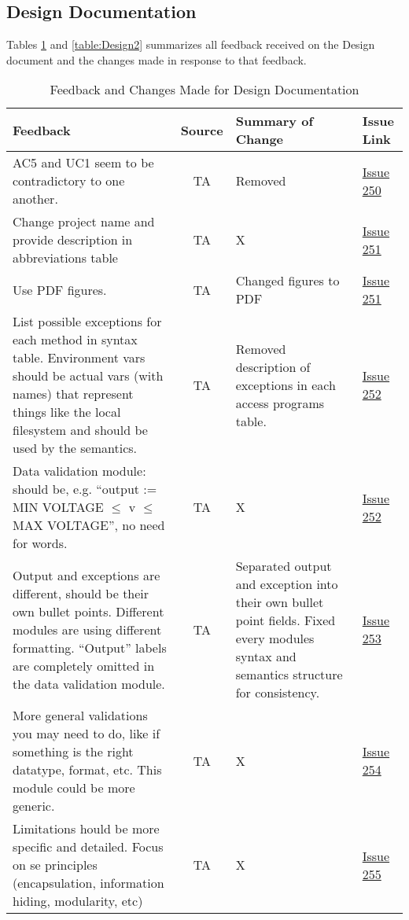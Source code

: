 \documentclass{article}
\begin{document}
\subsection{Design Documentation}
Tables \ref{table:Design1} and \ref{table:Design2} summarizes all feedback received on the Design document
and the changes made in response to that feedback.
\begin{table}[H]
\centering
\begin{tabularx}{\textwidth}{|X|c|X|p{1.5cm}|}
    \hline
    \textbf{Feedback} & \textbf{Source} & \textbf{Summary of Change}
    & \textbf{Issue Link} \\
    \hline
    AC5 and UC1 seem to be contradictory to one another. & TA & Removed &
    \href{https://github.com/SumanyaG/Alkalytics/issues/250}{Issue 250} \\
    \hline
    Change project name and provide description in abbreviations table & TA & X
    & \href{https://github.com/SumanyaG/Alkalytics/issues/251}{Issue 251} \\
    \hline
    Use PDF figures. & TA & Changed figures to PDF &
    \href{https://github.com/SumanyaG/Alkalytics/issues/251}{Issue 251} \\
    \hline
    List possible exceptions for each method in syntax table. Environment vars
    should be actual vars (with names) that represent things like the local
    filesystem and should be used by the semantics. & TA & Removed description
    of exceptions in each access programs table. &
    \href{https://github.com/SumanyaG/Alkalytics/issues/252}{Issue 252} \\
    \hline
    Data validation module: should be, e.g. ``output := MIN VOLTAGE $\le$ v
    $\le$ MAX VOLTAGE'', no need for words. & TA & X &
    \href{https://github.com/SumanyaG/Alkalytics/issues/252}{Issue 252} \\
    \hline
    Output and exceptions are different, should be their own bullet points.
    Different modules are using different formatting. ``Output'' labels are
    completely omitted in the data validation module. & TA & Separated output
    and exception into their own bullet point fields. Fixed every modules syntax
    and semantics structure for consistency. &
    \href{https://github.com/SumanyaG/Alkalytics/issues/253}{Issue 253} \\
    \hline
    More general validations you may need to do, like if something is the
    right datatype, format, etc. This module could be more generic. & TA & X &
    \href{https://github.com/SumanyaG/Alkalytics/issues/254}{Issue 254} \\
    \hline
    Limitations hould be more specific and detailed. Focus on se principles
    (encapsulation, information hiding, modularity, etc) & TA & X &
    \href{https://github.com/SumanyaG/Alkalytics/issues/255}{Issue 255} \\
    \hline
\end{tabularx}
\caption{Feedback and Changes Made for Design Documentation}
\label{table:Design1}
\end{table}
\end{document}
